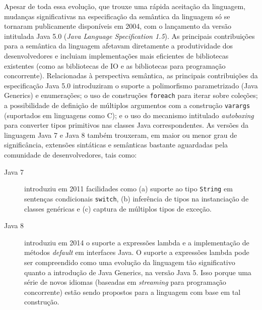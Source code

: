 Apesar de toda essa evolu\c c\~{a}o, que 
trouxe uma r\'{a}pida aceita\c c\~{a}o da linguagem, 
mudan\c cas significativas na especifica\c c\~{a}o 
da sem\^{a}ntica da linguagem s\'{o} se 
tornaram publicamente dispon\'{i}veis em 2004, 
com o lan\c camento da vers\~{a}o intitulada 
Java 5.0 (\emph{Java Language Specification 1.5}). As principais 
contribui\c c\~{o}es para a sem\^{a}ntica da linguagem afetavam 
diretamente a produtividade dos desenvolvedores e incluiam 
implementa\c c\~{o}es mais eficientes de bibliotecas 
existentes (como as bibliotecas de IO e as bibliotecas 
para programa\c c\~{a}o concorrente). Relacionadas \`{a} 
perspectiva sem\^{a}ntica, as principais contribui\c c\~{o}es 
da especifica\c c\~{a}o Java 5.0 introduziram o suporte 
a polimorfismo parametrizado (Java Generics) e enumera\c c\~{o}es; 
o uso de constru\c c\~{o}es \texttt{foreach} para iterar 
sobre cole\c c\~{o}es; a possibilidade de defini\c c\~{a}o de m\'{u}ltiplos 
argumentos com a constru\c c\~{a}o \texttt{varargs} (suportados em 
linguagens como C); e o uso do mecanismo intitulado 
\emph{autoboxing} para converter tipos primitivos nas 
classes Java correspondentes. 
As vers\~{o}es da linguagem Java 7 e Java 8 tamb\'{e}m trouxeram, 
em maior ou menor grau de signific\^{a}ncia, extens\~{o}es sint\'{a}ticas 
e sem\^{a}nticas bastante aguardadas pela comunidade de 
desenvolvedores, tais como:

\begin{description}
\item[Java 7] introduziu em 2011 facilidades como (a) suporte ao tipo \texttt{String} 
em senten\c cas condicionais \texttt{switch}, (b) infer\^{e}ncia de tipos 
na instancia\c c\~{a}o de classes gen\'{e}ricas e (c) captura de 
m\'{u}ltiplos tipos de exce\c c\~{a}o. 

\item[Java 8] introduziu em 2014 o suporte a express\~{o}es lambda e a implementa\c c\~{a}o de 
m\'{e}todos \emph{default} em interfaces Java. O suporte a express\~{o}es lambda pode 
ser compreendido como uma evolu\c c\~{a}o da linguagem t\~{a}o significativo 
quanto a introdu\c c\~{a}o de Java Generics, na vers\~{a}o Java 5. Isso porque 
uma s\'{e}rie de novos idiomas (baseadas em \emph{streaming} para programa\c c\~{a}o 
concorrente) est\~{a}o sendo propostos para a linguagem com base em tal constru\c c\~{a}o.   
\end{description} 




